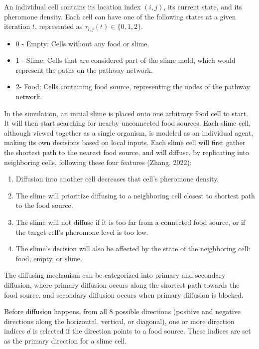 \documentclass[11pt]{article}
\begin{document}
An individual cell contains its location index \((i,j)\), its current
state, and its pheromone density. Each cell can have one of the
following states at a given iteration \(t\), represented as
\(\tau_{i,j}(t) \in \text{\{}0,1,2\text{\}}\).

\begin{itemize}
\item
  0 - Empty: Cells without any food or slime.
\item
  1 - Slime: Cells that are considered part of the slime mold, which
  would represent the paths on the pathway network.
\item
  2- Food: Cells containing food source, representing the nodes of the
  pathway network.
\end{itemize}

In the simulation, an initial slime is placed onto one arbitrary food
cell to start. It will then start searching for nearby unconnected food
sources. Each slime cell, although viewed together as a single organism,
is modeled as an individual agent, making its own decisions based on
local inputs. Each slime cell will first gather the shortest path to the
nearest food source, and will diffuse, by replicating into neighboring
cells, following these four features (Zhang, 2022):

\begin{enumerate}
\def\labelenumi{\arabic{enumi}.}
\item
  Diffusion into another cell decreases that cell's pheromone density.
\item
  The slime will prioritize diffusing to a neighboring cell closest to
  shortest path to the food source.
\item
  The slime will not diffuse if it is too far from a connected food
  source, or if the target cell's pheromone level is too low.
\item
  The slime's decision will also be affected by the state of the
  neighboring cell: food, empty, or slime.
\end{enumerate}

The diffusing mechanism can be categorized into primary and secondary
diffusion, where primary diffusion occurs along the shortest path
towards the food source, and secondary diffusion occurs when primary
diffusion is blocked.

Before diffusion happens, from all 8 possible directions (positive and
negative directions along the horizontal, vertical, or diagonal), one or
more direction indices \(d\) is selected if the direction points to a
food source. These indices are set as the primary direction for a slime
cell.
\end{document}
